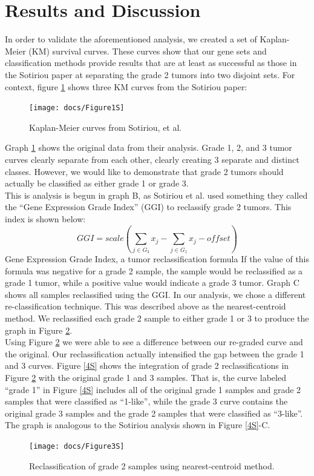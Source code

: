 \documentclass[a4paper,10pt]{article}
\begin{document}
\section{Results and Discussion}

In order to validate the aforementioned analysis, we created a set of Kaplan-Meier 
(KM) survival curves. These curves show that our gene sets and classification 
methods provide results that are at least as successful as those in the Sotiriou 
paper at separating the grade 2 tumors into two disjoint sets. 
For context, figure \ref{1S} shows three KM curves from the Sotiriou paper:
\begin{figure}
\centering
\texttt{[image: docs/Figure1S]}
\caption{Kaplan-Meier curves from Sotiriou, et al.}\label{1S}
\end{figure}
Graph \ref{1S} shows the original data from their analysis. Grade 1, 2, and 3 tumor 
curves clearly separate from each other, clearly creating 3 separate and distinct 
classes. However, we would like to demonstrate that grade 2 tumors should 
actually be classified as either grade 1 or grade 3. \\

This is analysis is begun in graph B, as Sotiriou et al. used something 
they called the “Gene Expression Grade Index” (GGI) to reclassify 
grade 2 tumors. This index is shown below:
$$
GGI = scale\left( \sum_{j\in G_3}{ x_j } - \sum_{j\in G_1}{ x_j } - offset  \right)
$$
Gene Expression Grade Index, a tumor reclassification formula
If the value of this formula was negative for a grade 2 sample, 
the sample would be reclassified as a grade 1 tumor, while a positive 
value would indicate a grade 3 tumor. Graph C shows all samples reclassified using the GGI.
In our analysis, we chose a different re-classification technique. 
This was described above as the nearest-centroid method. We reclassified 
each grade 2 sample to either grade 1 or 3 to produce the graph in Figure \ref{3S}.\\



Using Figure \ref{3S} we were able to see a difference between our re-graded curve 
and the original. Our reclassification actually intensified the gap between the grade 1 and 3 curves.
Figure \ref{4S} shows the integration of grade 2 reclassifications in Figure  \ref{3S} with 
the original grade 1 and 3 samples. That is, the curve labeled “grade 1” in 
Figure  \ref{4S} includes all of the original grade 1 samples and grade 2 samples 
that were classified as “1-like”, while the grade 3 curve contains the original
 grade 3 samples and the grade 2 samples that were classified as “3-like”. 
The graph is analogous to the Sotiriou analysis shown in Figure \ref{4S}-C.
\begin{figure}
\centering
\texttt{[image: docs/Figure3S]}
\caption{Reclassification of grade 2 samples using nearest-centroid method.}\label{3S}
\end{figure}
\end{document}
